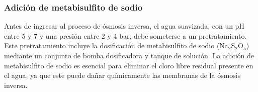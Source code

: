 \subsubsection{Adición de metabisulfito de sodio}

Antes de ingresar al proceso de ósmosis inversa, el agua suavizada, con un pH entre 5 y 7 y una presión entre 2 y 4 bar, debe someterse a un pretratamiento.
Este pretratamiento incluye la dosificación de metabisulfito de sodio (Na$_2$S$_2$O$_5$) mediante un conjunto de bomba dosificadora y tanque de solución.
La adición de metabisulfito de sodio es esencial para eliminar el cloro libre residual presente en el agua,
ya que este puede dañar químicamente las membranas de la ósmosis inversa.\\